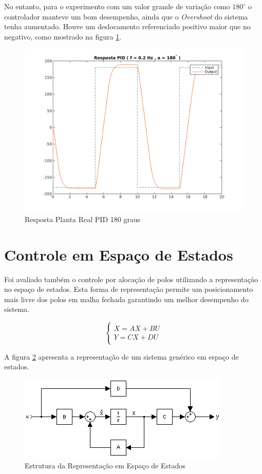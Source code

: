 \documentclass[a4paper,11pt]{article}
\begin{document}
No entanto, para o experimento com um valor grande de variação como $180^\circ$ o controlador manteve um bom desempenho, ainda que o \textit{Overshoot} do sistema tenha aumentado. Houve um deslocamento referenciado positivo maior que no negativo, como mostrado na figura \ref{fig:quanserpid_s180num5}.

\begin{figure}[H]
    \centering
    \includegraphics[width=0.8\linewidth]{tex/img/quanserpid_s180num5.png}
    \caption{Resposta Planta Real PID 180 graus}
    \label{fig:quanserpid_s180num5}
\end{figure}

\section{Controle em Espaço de Estados}

Foi avaliado também o controle por alocação de polos utilizando a representação no espaço de estados. Esta forma de representação permite um posicionamento mais livre dos polos em malha fechada garantindo um melhor desempenho do sistema.

\begin{equation}
\left\{
\begin{array}{c}
    \dot{X} = A X + B U \\
    Y = C X + D U \\
\end{array}
\right.
\end{equation}

A figura \ref{fig:space_state_model} apresenta a representação de um sistema genérico em espaço de estados.

\begin{figure}[H]
    \centering
    \includegraphics{tex/img/space_state_model.png}
    \caption{Estrutura da Representação em Espaço de Estados}
    \label{fig:space_state_model}
\end{figure}
\end{document}
